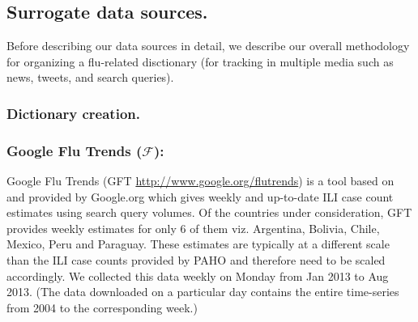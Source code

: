 

\subsection{Surrogate data sources.} Before
describing our data sources in detail, we describe our overall methodology
for organizing a flu-related disctionary (for tracking in multiple media such
as news, tweets, and search queries).

\subsubsection{\label{sec:keyword} Dictionary creation.} 

\subsubsection{Google Flu Trends ($\mathcal{F}$):}
Google Flu Trends (GFT \url{http://www.google.org/flutrends}) is a tool based
on~\cite{ginsberg2008detecting} and provided by Google.org which gives weekly
and up-to-date ILI case count estimates using search query volumes. 
Of the countries under
consideration, GFT provides weekly estimates for only 6 of them viz.  Argentina,
Bolivia, Chile, Mexico, Peru and Paraguay. 
These estimates are typically at
a different scale than the ILI case counts provided by PAHO and therefore need
to be scaled accordingly.  We collected this data weekly on Monday from Jan
2013 to Aug 2013. (The data downloaded on a particular day contains the entire
time-series from 2004 to the corresponding week.)
 
